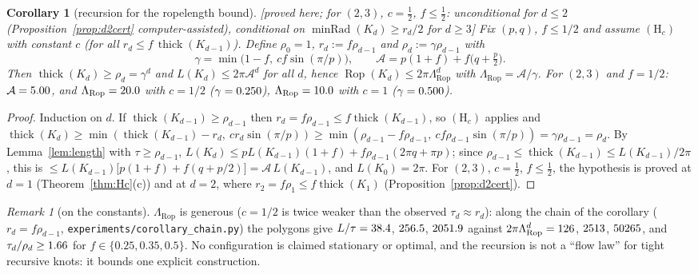\documentclass[10pt,a4paper]{article}
\theoremstyle{plain}
\newtheorem{corollary}[theorem]{Corollary}
\theoremstyle{definition}
\theoremstyle{remark}
\newtheorem{remark}[theorem]{Remark}
\newcommand{\thick}{\operatorname{thick}}
\newcommand{\Rop}{\operatorname{Rop}}
\newcommand{\minRad}{\operatorname{minRad}}
\newcommand{\status}[1]{\textsf{\small [#1]}}
\begin{document}
\begin{corollary}[recursion for the ropelength bound]\label{cor:rec}\status{proved here; for $(2,3)$, $c=\frac12$, $f\le\frac12$: unconditional for $d\le2$ (Proposition~\ref{prop:d2cert} computer-assisted), conditional on $\minRad(K_d)\ge r_d/2$ for $d\ge3$}
Fix $(p,q)$, $f\le1/2$ and assume $(\mathrm H_c)$ with constant $c$ (for all $r_d\le f\,\thick(K_{d-1})$). Define $\rho_0=1$, $r_d:=f\rho_{d-1}$ and $\rho_d:=\gamma\rho_{d-1}$ with
\begin{equation}\label{eq:consts}
\gamma=\min\bigl(1-f,\ c f\sin(\pi/p)\bigr),\qquad \mathcal A=p(1+f)+f\bigl(q+\tfrac p2\bigr).
\end{equation}
Then $\thick(K_d)\ge\rho_d=\gamma^d$ and $L(K_d)\le2\pi\mathcal A^d$ for all $d$, hence $\Rop(K_d)\le2\pi\Lambda_{\Rop}^d$ with $\Lambda_{\Rop}=\mathcal A/\gamma$. For $(2,3)$ and $f=1/2$: $\mathcal A=5.00$, and $\Lambda_{\Rop}=\LambdaHalf$ with $c=1/2$ ($\gamma=0.250$), $\Lambda_{\Rop}=\LambdaOneHalf$ with $c=1$ ($\gamma=0.500$).
\end{corollary}
\begin{proof}
Induction on $d$. If $\thick(K_{d-1})\ge\rho_{d-1}$ then $r_d=f\rho_{d-1}\le f\thick(K_{d-1})$, so $(\mathrm H_c)$ applies and $\thick(K_d)\ge\min(\thick(K_{d-1})-r_d,\ cr_d\sin(\pi/p))\ge\min(\rho_{d-1}-f\rho_{d-1},\ cf\rho_{d-1}\sin(\pi/p))=\gamma\rho_{d-1}=\rho_d$. By Lemma~\ref{lem:length} with $\tau\ge\rho_{d-1}$, $L(K_d)\le pL(K_{d-1})(1+f)+f\rho_{d-1}(2\pi q+\pi p)$; since $\rho_{d-1}\le\thick(K_{d-1})\le L(K_{d-1})/2\pi$, this is $\le L(K_{d-1})\bigl[p(1+f)+f(q+p/2)\bigr]=\mathcal A\,L(K_{d-1})$, and $L(K_0)=2\pi$. For $(2,3)$, $c=\frac12$, $f\le\frac12$, the hypothesis is proved at $d=1$ (Theorem~\ref{thm:Hc}(c)) and at $d=2$, where $r_2=f\rho_1\le f\thick(K_1)$ (Proposition~\ref{prop:d2cert}).
\end{proof}

\begin{remark}[on the constants]
$\Lambda_{\Rop}$ is generous ($c=1/2$ is twice weaker than the observed $\tau_d\approx r_d$): along the chain of the corollary ($r_d=f\rho_{d-1}$, \texttt{experiments/corollary\_chain.py}) the polygons give $L/\tau=38.4$, $256.5$, $2051.9$ against $2\pi\Lambda_{\Rop}^d=\BoundHalfOne$, $2513$, $50265$, and $\tau_d/\rho_d\ge1.66$ for $f\in\{0.25,0.35,0.5\}$. No configuration is claimed stationary or optimal, and the recursion is not a ``flow law'' for tight recursive knots: it bounds one explicit construction.
\end{remark}
\end{document}
